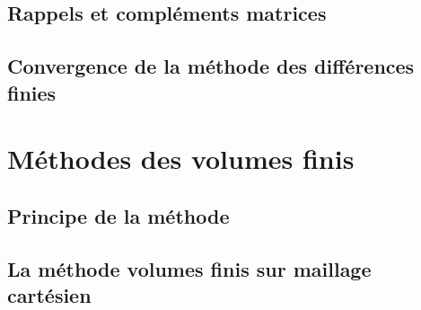 \documentclass[10pt,a4paper]{report}
\begin{document}
\section*{Rappels et compléments matrices}
\section*{Convergence de la méthode des différences finies}
\chapter*{Méthodes des volumes finis}
\section*{Principe de la méthode}
\section*{La méthode volumes finis sur maillage cartésien}
\end{document}
